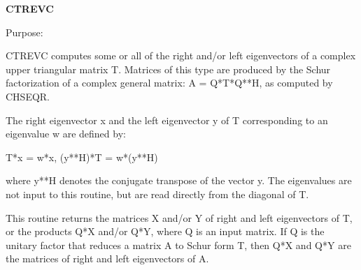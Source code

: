 {\bfseries C\+T\+R\+E\+V\+C} 

 \begin{DoxyParagraph}{Purpose\+: }
\begin{DoxyVerb} CTREVC computes some or all of the right and/or left eigenvectors of
 a complex upper triangular matrix T.
 Matrices of this type are produced by the Schur factorization of
 a complex general matrix:  A = Q*T*Q**H, as computed by CHSEQR.
 
 The right eigenvector x and the left eigenvector y of T corresponding
 to an eigenvalue w are defined by:
 
              T*x = w*x,     (y**H)*T = w*(y**H)
 
 where y**H denotes the conjugate transpose of the vector y.
 The eigenvalues are not input to this routine, but are read directly
 from the diagonal of T.
 
 This routine returns the matrices X and/or Y of right and left
 eigenvectors of T, or the products Q*X and/or Q*Y, where Q is an
 input matrix.  If Q is the unitary factor that reduces a matrix A to
 Schur form T, then Q*X and Q*Y are the matrices of right and left
 eigenvectors of A.\end{DoxyVerb}
 
\end{DoxyParagraph}

